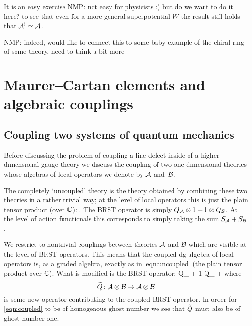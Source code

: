 \documentclass[11pt]{amsart}
\def\natalie#1{{\textcolor{green!65!black}{NMP: {#1}}}}
\begin{document}
It is an easy exercise \natalie{not easy for physicists :) but do we want to do it here?} to see that even for a more general superpotential $W$ the result still holds that $\mathcal A^! \simeq \mathcal A$.

\natalie{indeed, would like to connect this to some baby example of the chiral ring of some theory, need to think a bit more}




\section{Maurer--Cartan elements and algebraic couplings}






\subsection{Coupling two systems of quantum mechanics} 

Before discussing the problem of coupling a line defect inside of a higher dimensional gauge theory we discuss the coupling of two one-dimensional theories whose algebras of local operators we denote by $\mathcal A$ and~$\mathcal B$. 

The completely `uncoupled' theory is the theory obtained by combining these two 
theories in a rather trivial way; at the level of local operators this is just the plain tensor product (over $\mathbb C$):
\beqn\label{eqn:uncoupled}
\cA \otimes \cB .
\eeqn
The BRST operator is simply $Q_\mathcal A \otimes 1 + 1 \otimes Q_\mathcal B$.
At the level of action functionals this corresponds to simply taking the sum $S_{\mathcal A} + S_{\mathcal B}$. 

We restrict to nontrivial couplings between theories $\mathcal A$ and $\mathcal B$ which are visible at the level of BRST operators. 
This means that the coupled dg algebra of local operators is, as a graded algebra, exactly as in \eqref{eqn:uncoupled} (the plain tensor product over $\mathbb C$). 
What is modified is the BRST operator: 
\beqn\label{eqn:coupled}
Q_{\cA}  + 1 \otimes Q_{\cB} + 
\eeqn
where 
\[
\widetilde{Q} \colon \mathcal A \otimes \mathcal B \to \mathcal A \otimes \mathcal B
\]
is some new operator contributing to the coupled BRST operator. 
In order for \eqref{eqn:coupled} to be of homogenous ghost number we see that $\widetilde{Q}$ must also be of ghost number one.
\end{document}
